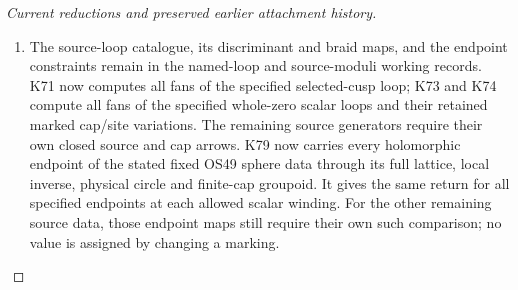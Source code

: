 \begin{proof}[Current reductions and preserved earlier attachment history]
\begin{enumerate}[label=\arabic*.]
\item The source-loop catalogue, its discriminant and braid maps,
and the endpoint constraints remain in the named-loop and
source-moduli working records. K71 now computes all fans of
the specified selected-cusp loop; K73 and K74 compute all
fans of the specified whole-zero scalar loops and their
retained marked cap/site variations. The remaining source
generators require their own closed source and cap arrows.
K79 now carries every holomorphic endpoint of the stated fixed
OS49 sphere data through its full lattice, local inverse, physical
circle and finite-cap groupoid. It gives the same return for all
specified endpoints at each allowed scalar winding. For the other
remaining source data, those endpoint maps still require their
own such comparison; no value is assigned by changing a marking.

\end{enumerate}
\end{proof}